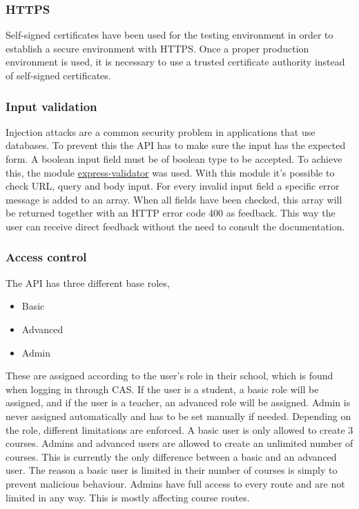 \subsubsection{HTTPS} \label{https}
Self-signed certificates have been used for the testing environment in order to establish a secure environment with HTTPS. Once a proper production environment is used, it is necessary to use a trusted certificate authority instead of self-signed certificates.

\subsubsection{Input validation}
Injection attacks are a common security problem in applications that use databases. To prevent this the API has to make sure the input has the expected form. A boolean input field must be of boolean type to be accepted. To achieve this, the module \href{https://github.com/ctavan/express-validator}{express-validator} was used. With this module it's possible to check URL, query and body input. For every invalid input field a specific error message is added to an array. When all fields have been checked, this array will be returned together with an HTTP error code 400 as feedback. This way the user can receive direct feedback without the need to consult the documentation.

\subsubsection{Access control}
The API has three different base roles, 
\begin{itemize}
\item Basic
\item Advanced
\item Admin
\end{itemize}
These are assigned according to the user's role in their school, which is found when logging in through CAS. If the user is a student, a basic role will be assigned, and if the user is a teacher, an advanced role will be assigned. Admin is never assigned automatically and has to be set manually if needed. Depending on the role, different limitations are enforced. A basic user is only allowed to create 3 courses. Admins and advanced users are allowed to create an unlimited number of courses. This is currently the only difference between a basic and an advanced user. The reason a basic user is limited in their number of courses is simply to prevent malicious behaviour. Admins have full access to every route and are not limited in any way. This is mostly affecting course routes. 

